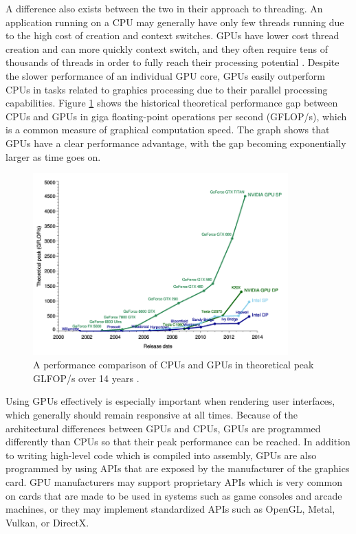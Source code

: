 \documentclass{article}
\begin{document}
A difference also exists between the two in their approach to threading. An application running on a CPU may generally have only few threads running due to the high cost of creation and context switches. GPUs have lower cost thread creation and can more quickly context switch, and they often require tens of thousands of threads in order to fully reach their processing potential \cite{larkin2016}. Despite the slower performance of an individual GPU core, GPUs easily outperform CPUs in tasks related to graphics processing due to their parallel processing capabilities. Figure \ref{fig:performance} shows the historical theoretical performance gap between CPUs and GPUs in giga floating-point operations per second (GFLOP/s), which is a common measure of graphical computation speed. The graph shows that GPUs have a clear performance advantage, with the gap becoming exponentially larger as time goes on. 

\begin{figure}[h]
	\centering
	\includegraphics[height=7cm]{cpu-vs-gpu}
	\caption{A performance comparison of CPUs and GPUs in theoretical peak GLFOP/s over 14 years \cite{galloy2013}.}
	\label{fig:performance}
\end{figure}

Using GPUs effectively is especially important when rendering user interfaces, which generally should remain responsive at all times. Because of the architectural differences between GPUs and CPUs, GPUs are programmed differently than CPUs so that their peak performance can be reached. In addition to writing high-level code which is compiled into assembly, GPUs are also programmed by using APIs that are exposed by the manufacturer of the graphics card. GPU manufacturers may support proprietary APIs which is very common on cards that are made to be used in systems such as game consoles and arcade machines, or they may implement standardized APIs such as OpenGL, Metal, Vulkan, or DirectX.
\end{document}
